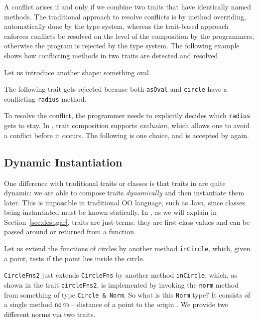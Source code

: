 A conflict arises if and only if we combine two traits that have identically
named methods. The traditional approach to resolve conflicts is by method
overriding, automatically done by the type system, whereas the trait-based
approach enforces conflicts be resolved on the level of the composition by the
programmers, otherwise the program is rejected by the type system. The following
example shows how conflicting methods in two traits are detected and resolved.

Let us introduce another shape: something oval.

The following trait gets rejected because both \lstinline{asOval} and
\lstinline{circle} have a conflicting \lstinline{radius} method.

To resolve the conflict, the programmer needs to explicitly decides which
\lstinline{radius} gets to stay. In \name, trait composition supports
\textit{exclusion}, which allows one to avoid a conflict before it occurs. The
following is one choice, and is accepted by \name again.



\subsection{Dynamic Instantiation}

One difference with traditional traits or classes is that traits in \name are
quite dynamic: we are able to compose traits \textit{dynamically} and then
instantiate them later. This is impossible in traditional OO language, such as
Java, since classes being instantiated must be known statically. In \name, as we
will explain in Section~\ref{sec:desugar}, traits are just terms: they are
first-class values and can be passed around or returned from a function.

Let us extend the functions of circles by another method \lstinline{inCircle},
which, given a point, tests if the point lies inside the circle.

\lstinline{CircleFns2} just extends \lstinline{CircleFns} by another method
\lstinline{inCircle}, which, as shown in the trait \lstinline{circleFns2}, is
implemented by invoking the \lstinline{norm} method from something of type
\lstinline{Circle & Norm}. So what is this \lstinline{Norm} type? It consists of a single
method \lstinline{norm} -- distance of a point to the origin . We provide two
different norms via two traits.

